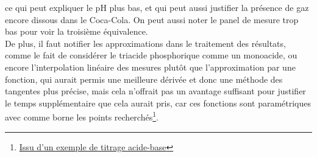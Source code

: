 \documentclass[11pt]{article}
\begin{document}
ce qui peut expliquer le pH plus bas, et qui peut aussi justifier la présence de gaz encore dissous dans le Coca-Cola.
On peut aussi noter le panel de mesure trop bas pour voir la troisième équivalence.\\
De plus, il faut notifier les approximations dans le traitement des résultats, comme le fait de considérer le triacide
phosphorique comme un monoacide, ou encore l'interpolation linéaire des mesures plutôt que l'approximation par une
fonction, qui aurait permis une meilleure dérivée et donc une méthode des tangentes plus précise, mais cela n'offrait pas
un avantage suffisant pour justifier le temps supplémentaire que cela aurait pris, car ces fonctions sont paramétriques
avec comme borne les points recherchés\footnote{\href{https://www.epfl.ch/labs/gdp/wp-content/uploads/2019/09/ERC_18_Chapitre_7C.pdf}{Issu d'un exemple de titrage acide-base}}.\\
\end{document}
